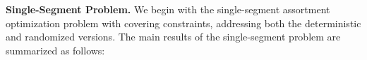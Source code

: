 \documentclass[msom,non-blindrev]{informs3} %
\theoremstyle{definition}
\begin{document}
\noindent\textbf{Single-Segment Problem.} We begin with the single-segment assortment optimization problem with covering constraints, addressing both the deterministic and randomized versions. The main results of the single-segment problem are summarized as follows:

\end{document}
